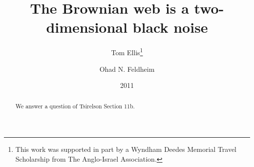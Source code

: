 {
\title{The Brownian web is a two-dimensional black noise}

\newcommand{\tomthanks}{This work was supported in part by
a Wyndham Deedes Memorial Travel Scholarship from The Anglo-Israel
Association.}

\author{Tom Ellis\thanks{\tomthanks}\\%
\and Ohad N. Feldheim}

\date{2011}

\maketitle

\begin{abstract}
We answer a question of
Tsirelson \cite{tsirelson-nonclassical-stochastic-flows} Section 11b.

\end{abstract}


}

